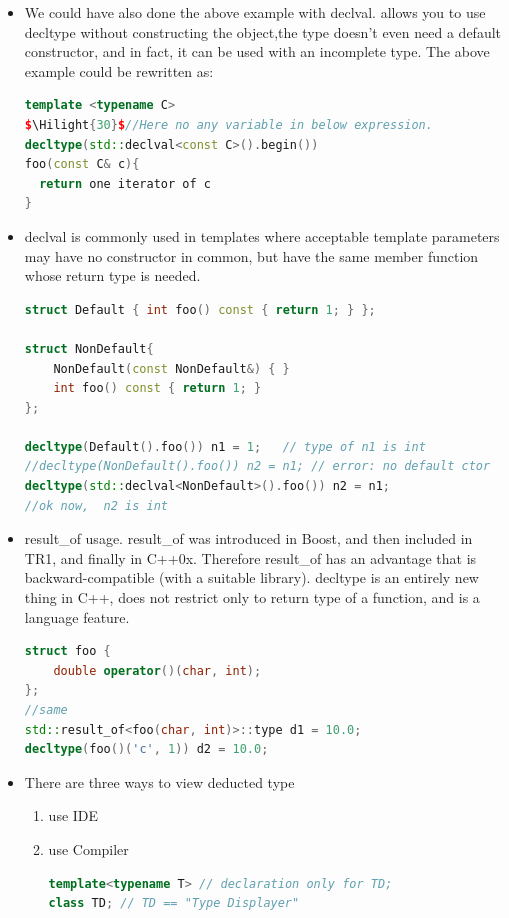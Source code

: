 \documentclass[a4paper,12pt,twoside]{book}
\newcommand{\Hilight}[1]{\makebox[0pt][l]{\color{yellow}\rule[-3pt]{#1em}{11pt}}}
\begin{document}
\begin{itemize}
\item We could have also done the above example with declval. allows you to use decltype without constructing the object,the type doesn't even need a default constructor, and in fact, it can be used with an incomplete type. The above example could be rewritten as:

\begin{lstlisting}[frame=single, language=c++, mathescape=true]
template <typename C>
$\Hilight{30}$//Here no any variable in below expression.
decltype(std::declval<const C>().begin())
foo(const C& c){
  return one iterator of c
}
\end{lstlisting}

\item declval is commonly used in templates where acceptable template parameters may have no constructor in common, but have the same member function whose return type is needed.

\begin{lstlisting}[frame=single, language=c++]
struct Default { int foo() const { return 1; } };

struct NonDefault{
    NonDefault(const NonDefault&) { }
    int foo() const { return 1; }
};

decltype(Default().foo()) n1 = 1;   // type of n1 is int
//decltype(NonDefault().foo()) n2 = n1; // error: no default ctor
decltype(std::declval<NonDefault>().foo()) n2 = n1;
//ok now,  n2 is int
\end{lstlisting}

\item result\_of usage. result\_of was introduced in Boost, and then included in TR1, and finally in C++0x. Therefore result\_of has an advantage that is backward-compatible (with a suitable library). decltype is an entirely new thing in C++, does not restrict only to return type of a function, and is a language feature.
\begin{lstlisting}[frame=single, language=c++]
struct foo {
    double operator()(char, int);
};
//same
std::result_of<foo(char, int)>::type d1 = 10.0;
decltype(foo()('c', 1)) d2 = 10.0;
\end{lstlisting}



\item There are three ways to view deducted type
\begin{enumerate}
\item use IDE
\item use Compiler
\begin{lstlisting}[frame=single, language=c++]
template<typename T> // declaration only for TD;
class TD; // TD == "Type Displayer"


\end{lstlisting}
\end{enumerate}
\end{itemize}
\end{document}
